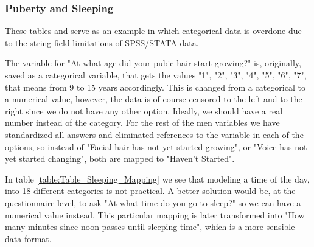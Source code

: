 \subsubsection{Puberty and Sleeping}

These tables and serve as an example in which categorical data is overdone due to the string field limitations of SPSS/STATA data. 

The variable for "At what age did your pubic hair start growing?" is, originally, saved as a categorical variable, that gets the values "1", "2", "3", "4", "5", "6", "7", that means from 9 to 15 years accordingly. This is changed from a categorical to a numerical value, however, the data is of course censored to the left and to the right since we do not have any other option. Ideally, we should have a real number instead of the category. For the rest of the men variables we have standardized all answers and eliminated references to the variable in each of the options, so instead of "Facial hair has not yet started growing", or "Voice has not yet started changing", both are mapped to "Haven't Started".

In table \ref{table:Table_Sleeping_Mapping} we see that modeling a time of the day, into 18 different categories is not practical. A better solution would be, at the questionnaire level, to ask "At what time do you go to sleep?" so we can have a numerical value instead. This particular mapping is later transformed into "How many minutes since noon passes until sleeping time", which is a more sensible data format.

